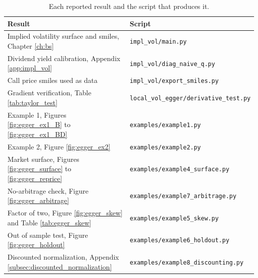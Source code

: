 \begin{table}[h!]
    \centering
    \begin{tabular}{l l}
        \toprule
        Result & Script \\
        \midrule
        Implied volatility surface and smiles, Chapter \ref{ch:bs}
            & \texttt{impl\_vol/main.py} \\
        Dividend yield calibration, Appendix \ref{app:impl_vol}
            & \texttt{impl\_vol/diag\_naive\_q.py} \\
        Call price smiles used as data
            & \texttt{impl\_vol/export\_smiles.py} \\
        Gradient verification, Table \ref{tab:taylor_test}
            & \texttt{local\_vol\_egger/derivative\_test.py} \\
        Example 1, Figures \ref{fig:egger_ex1_B} to \ref{fig:egger_ex1_BD}
            & \texttt{examples/example1.py} \\
        Example 2, Figure \ref{fig:egger_ex2}
            & \texttt{examples/example2.py} \\
        Market surface, Figures \ref{fig:egger_surface} to \ref{fig:egger_reprice}
            & \texttt{examples/example4\_surface.py} \\
        No-arbitrage check, Figure \ref{fig:egger_arbitrage}
            & \texttt{examples/example7\_arbitrage.py} \\
        Factor of two, Figure \ref{fig:egger_skew} and Table \ref{tab:egger_skew}
            & \texttt{examples/example5\_skew.py} \\
        Out of sample test, Figure \ref{fig:egger_holdout}
            & \texttt{examples/example6\_holdout.py} \\
        Discounted normalization, Appendix \ref{subsec:discounted_normalization}
            & \texttt{examples/example8\_discounting.py} \\
        \bottomrule
    \end{tabular}
    \caption{Each reported result and the script that produces it.}
    \label{tab:code_map}
\end{table}
